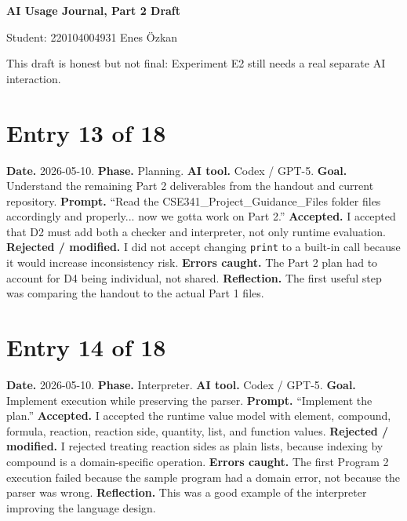 \documentclass[11pt,a4paper]{article}
\newcommand{\code}[1]{\texttt{#1}}
\begin{document}
\begin{center}
{\huge\bfseries AI Usage Journal, Part 2 Draft\par}
{\large Student: 220104004931 Enes Özkan\par}
{\footnotesize\color{anscaption}This draft is honest but not final: Experiment E2 still needs a real separate AI interaction.}
\end{center}

\section*{Entry 13 of 18}
\textbf{Date.} 2026-05-10.
\textbf{Phase.} Planning.
\textbf{AI tool.} Codex / GPT-5.
\textbf{Goal.} Understand the remaining Part 2 deliverables from the handout and current repository.
\textbf{Prompt.} ``Read the CSE341\_Project\_Guidance\_Files folder files accordingly and properly... now we gotta work on Part 2.''
\textbf{Accepted.} I accepted that D2 must add both a checker and interpreter, not only runtime evaluation.
\textbf{Rejected / modified.} I did not accept changing \code{print} to a built-in call because it would increase inconsistency risk.
\textbf{Errors caught.} The Part 2 plan had to account for D4 being individual, not shared.
\textbf{Reflection.} The first useful step was comparing the handout to the actual Part 1 files.

\section*{Entry 14 of 18}
\textbf{Date.} 2026-05-10.
\textbf{Phase.} Interpreter.
\textbf{AI tool.} Codex / GPT-5.
\textbf{Goal.} Implement execution while preserving the parser.
\textbf{Prompt.} ``Implement the plan.''
\textbf{Accepted.} I accepted the runtime value model with element, compound, formula, reaction, reaction side, quantity, list, and function values.
\textbf{Rejected / modified.} I rejected treating reaction sides as plain lists, because indexing by compound is a domain-specific operation.
\textbf{Errors caught.} The first Program 2 execution failed because the sample program had a domain error, not because the parser was wrong.
\textbf{Reflection.} This was a good example of the interpreter improving the language design.
\end{document}
